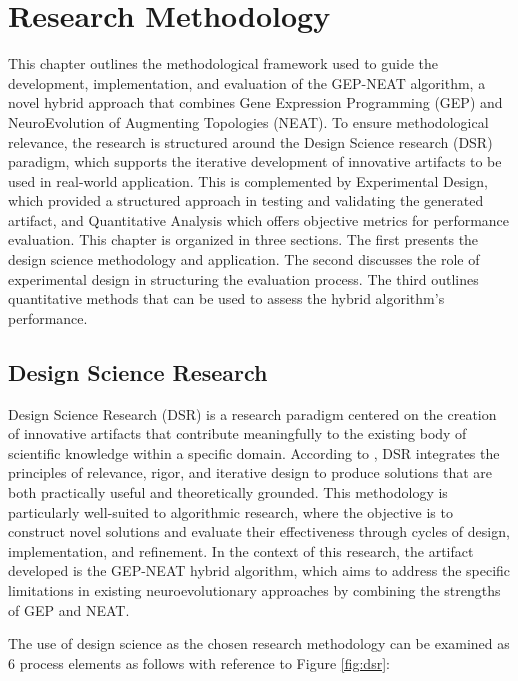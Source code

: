 \chapter{Research Methodology}
This chapter outlines the methodological framework used to guide the development, implementation, and evaluation of the GEP-NEAT algorithm, a novel hybrid approach that combines Gene Expression Programming (GEP) and NeuroEvolution of Augmenting Topologies (NEAT). To ensure methodological relevance, the research is structured around the Design Science research (DSR) paradigm, which supports the iterative development of innovative artifacts to be used in real-world application. This is complemented by Experimental Design, which provided a structured approach in testing and validating the generated artifact, and Quantitative Analysis which offers objective metrics for performance evaluation. This chapter is organized in three sections. The first presents the design science methodology and application. The second discusses the role of experimental design in structuring the evaluation process. The third outlines quantitative methods that can be used to assess the hybrid algorithm's performance.

\section{Design Science Research}
Design Science Research (DSR) is a research paradigm centered on the creation of innovative artifacts that contribute meaningfully to the existing body of scientific knowledge within a specific domain. According to \cite{hevner2004design}, DSR integrates the principles of relevance, rigor, and iterative design to produce solutions that are both practically useful and theoretically grounded. This methodology is particularly well-suited to algorithmic research, where the objective is to construct novel solutions and evaluate their effectiveness through cycles of design, implementation, and refinement. In the context of this research, the artifact developed is the GEP-NEAT hybrid algorithm, which aims to address the specific limitations in existing neuroevolutionary approaches by combining the strengths of GEP and NEAT. \bigskip

\noindent The use of design science as the chosen research methodology can be examined as 6 process elements as follows with reference to Figure \ref{fig:dsr}:

